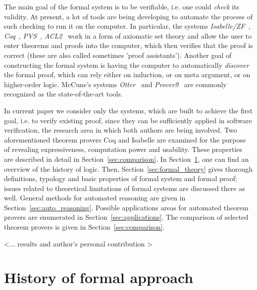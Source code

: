 \documentclass[article]{aaltoseries}
\begin{document}
The main goal of the formal system is to be verifiable, i.e. one could \textit{check} its validity. At present, a lot of tools are being developing to automate the process of such checking to run it on the computer. In particular, the systems \textit{Isabelle/ZF}~\cite{tool_Isabelle}, \textit{Coq}~\cite{tool_Coq}, \textit{PVS}~\cite{tool_Pvs}, \textit{ACL2}~\cite{tool_Acl} work in a form of axiomatic set theory and allow the user to enter theorems and proofs into the computer, which then verifies that the proof is correct (these are also called sometimes 'proof assistants').
Another goal of constructing the formal system is having the computer to automatically \textit{discover} the formal proof, which can rely either on induction, or on meta argument, or on higher-order logic. McCune’s systems \textit{Otter}~\cite{tool_Otter} and \textit{Prover9}~\cite{tool_Prover9} are commonly recognized as the state-of-the-art tools.

In current paper we consider only the systems, which are built to achieve the first goal, i.e. to verify existing proof, since they can be sufficiently applied in software verification, the research area in which both authors are being involved. Two aforementioned theorem provers Coq and Isabelle are examined for the purpose of revealing expressiveness, computation power and usability. These properties are described in detail in Section~\ref{sec:comparison}. 
In Section~\ref{sec:formal_history}, one can find an overview of the history of logic. Then, Section~\ref{sec:formal_theory} gives thorough definitions, typology and basic properties of formal system and formal proof; issues related to theoretical limitations of formal systems are discussed there as well. General methods for automated reasoning are given in Section~\ref{sec:auto_reasoning}. Possible applications areas for automated theorem provers are enumerated in Section~\ref{sec:applications}. The comparison of selected theorem provers is given in Section~\ref{sec:comparison}.

<... results and author's personal contribution >



\section{History of formal approach}
\label{sec:formal_history}
\end{document}
